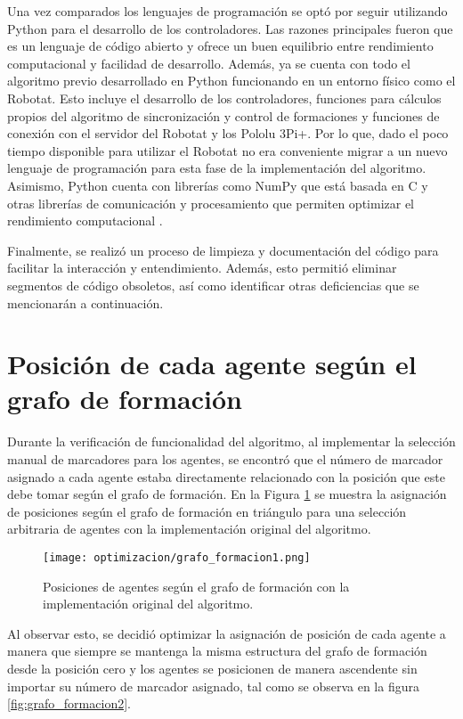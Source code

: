Una vez comparados los lenguajes de programación se optó por seguir utilizando Python para el desarrollo de los controladores. Las razones principales fueron que es un lenguaje de código abierto y ofrece un buen equilibrio entre rendimiento computacional y facilidad de desarrollo. Además, ya se cuenta con todo el algoritmo previo desarrollado en Python funcionando en un entorno físico como el Robotat. Esto incluye el desarrollo de los controladores, funciones para cálculos propios del algoritmo de sincronización y control de formaciones y funciones de conexión con el servidor del Robotat y los Pololu 3Pi+. Por lo que, dado el poco tiempo disponible para utilizar el Robotat no era conveniente migrar a un nuevo lenguaje de programación para esta fase de la implementación del algoritmo. Asimismo, Python cuenta con librerías como NumPy que está basada en C y otras librerías de comunicación y procesamiento que permiten optimizar el rendimiento computacional \cite{PythonVsC}.

Finalmente, se realizó un proceso de limpieza y documentación del código para facilitar la interacción y entendimiento. Además, esto permitió eliminar segmentos de código obsoletos, así como identificar otras deficiencias que se mencionarán a continuación.

\section{Posición de cada agente según el grafo de formación}
Durante la verificación de funcionalidad del algoritmo, al implementar la selección manual de marcadores para los agentes, se encontró que el número de marcador asignado a cada agente estaba directamente relacionado con la posición que este debe tomar según el grafo de formación. En la Figura \ref{fig:grafo_formacion1} se muestra la asignación de posiciones según el grafo de formación en triángulo para una selección arbitraria de agentes con la implementación original del algoritmo.

\begin{figure}[H]
	\centering
	\texttt{[image: optimizacion/grafo\_formacion1.png]}
	\caption{Posiciones de agentes según el grafo de formación con la implementación original del algoritmo.}
	\label{fig:grafo_formacion1}
\end{figure}

Al observar esto, se decidió optimizar la asignación de posición de cada agente a manera que siempre se mantenga la misma estructura del grafo de formación desde la posición cero y los agentes se posicionen de manera ascendente sin importar su número de marcador asignado, tal como se observa en la figura \ref{fig:grafo_formacion2}.


